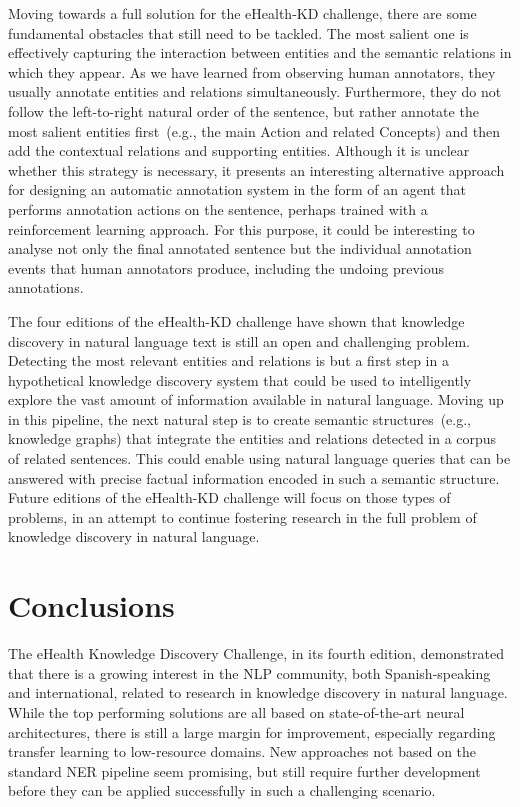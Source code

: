 \documentclass[a4paper,11pt,twocolumn,twoside]{article}
\begin{document}
Moving towards a full solution for the eHealth-KD challenge, there are some fundamental obstacles that still need to be tackled.
The most salient one is effectively capturing the interaction between entities and the semantic relations in which they appear.
As we have learned from observing human annotators, they usually annotate entities and relations simultaneously.
Furthermore, they do not follow the left-to-right natural order of the sentence, but rather annotate the most salient entities first~(e.g., the main Action and related Concepts) and then add the contextual relations and supporting entities.
Although it is unclear whether this strategy is necessary, it presents an interesting alternative approach for designing an automatic annotation system in the form of an agent that performs annotation actions on the sentence, perhaps trained with a reinforcement learning approach.
For this purpose, it could be interesting to analyse not only the final annotated sentence but the individual annotation events that human annotators produce, including the undoing previous annotations.

The four editions of the eHealth-KD challenge have shown that knowledge discovery in natural language text is still an open and challenging problem.
Detecting the most relevant entities and relations is but a first step in a hypothetical knowledge discovery system that could be used to intelligently explore the vast amount of information available in natural language.
Moving up in this pipeline, the next natural step is to create semantic structures~(e.g., knowledge graphs) that integrate the entities and relations detected in a corpus of related sentences.
This could enable using natural language queries that can be answered with precise factual information encoded in such a semantic structure.
Future editions of the eHealth-KD challenge will focus on those types of problems, in an attempt to continue fostering research in the full problem of knowledge discovery in natural language.


\section{Conclusions}\label{sec:conclusions}

The eHealth Knowledge Discovery Challenge, in its fourth edition, demonstrated that there is a growing interest in the NLP community, both Spanish-speaking and international, related to research in knowledge discovery in natural language.
While the top performing solutions are all based on state-of-the-art neural architectures, there is still a large margin for improvement, especially regarding transfer learning to low-resource domains.
New approaches not based on the standard NER pipeline seem promising, but still require further development before they can be applied successfully in such a challenging scenario.
\end{document}
